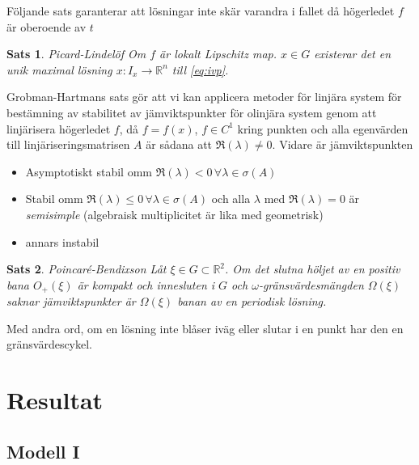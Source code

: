 \documentclass{article}
\newtheorem{theorem}{Sats}
\begin{document}
Följande sats garanterar att lösningar inte skär varandra
i fallet då högerledet $f$ är oberoende av $t$
\begin{theorem}{Picard-Lindelöf}
	Om $f$ är lokalt Lipschitz map. $x \in G$ existerar det en
	unik maximal lösning $x:I_x \to \mathbb R^n$ till \eqref{eq:ivp}.
\end{theorem}

Grobman-Hartmans sats gör att vi kan applicera metoder för
linjära system för
bestämning av stabilitet av jämviktspunkter
för olinjära system
genom att linjärisera högerledet $f$,
då $f=f(x)$, $f \in C^1$ kring punkten och
alla egenvärden till linjäriseringsmatrisen $A$
är sådana att $\Re(\lambda) \ne 0$.
Vidare är jämviktspunkten
\begin{itemize}
	\item Asymptotiskt stabil omm $\Re(\lambda) < 0 \, \forall \lambda \in \sigma(A)$
	\item Stabil omm $\Re(\lambda) \le 0 \, \forall \lambda \in \sigma(A)$
		och alla $\lambda$ med $\Re(\lambda) = 0$ är \emph{semisimple}
		(algebraisk multiplicitet är lika med geometrisk)
	\item annars instabil
\end{itemize}
\autocite{lnotes}

\begin{theorem}{Poincaré-Bendixson}
	Låt $\xi \in G \subset \mathbb R^2$.
	Om det slutna höljet av en positiv bana $O_+(\xi)$
	är kompakt och innesluten i $G$
	och $\omega$-gränsvärdesmängden $\Omega(\xi)$ saknar jämviktspunkter
	är $\Omega(\xi)$ banan av en periodisk lösning.
\end{theorem}
Med andra ord, om en lösning inte blåser iväg eller
slutar i en punkt har den en gränsvärdescykel.

\section{Resultat}

\subsection{Modell I}
\end{document}

